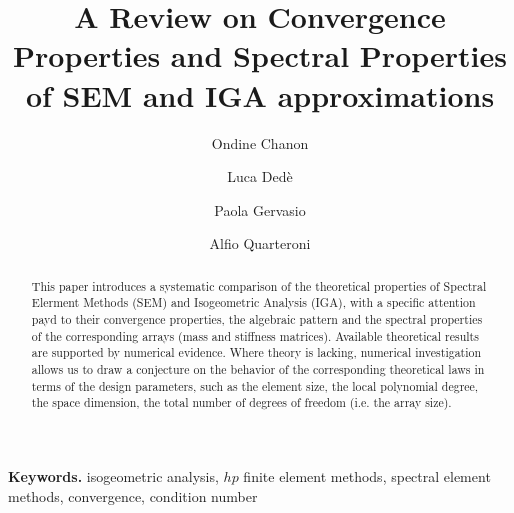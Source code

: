 \documentclass[11pt]{article}
\providecommand{\keywords}[1]{\textbf{Keywords.} #1}
\begin{document}
\title{A Review on Convergence Properties and Spectral Properties of SEM
and IGA approximations}
\author[1]{Ondine Chanon}
\author[2]{Luca Ded\`e}
\author[3]{Paola Gervasio}
\author[1,2]{Alfio Quarteroni}

\maketitle

%
%
%



\begin{abstract}
This paper introduces a systematic comparison of the theoretical properties 
of Spectral Elerment Methods (SEM) and Isogeometric Analysis (IGA), 
with a specific attention payd to their convergence properties, the algebraic
 pattern and the spectral properties of the corresponding arrays 
(mass and stiffness matrices). Available theoretical results are supported 
by numerical evidence. Where theory is lacking, numerical investigation 
allows us to draw a conjecture on the behavior of the corresponding 
theoretical laws in terms of the design parameters, such as the element size, 
the local polynomial degree, the space dimension, the total number of 
degrees of freedom (i.e. the array size).
\end{abstract}

\keywords
{isogeometric analysis,
$hp$ finite element methods,
spectral element methods, 
convergence,
condition number}
\end{document}
